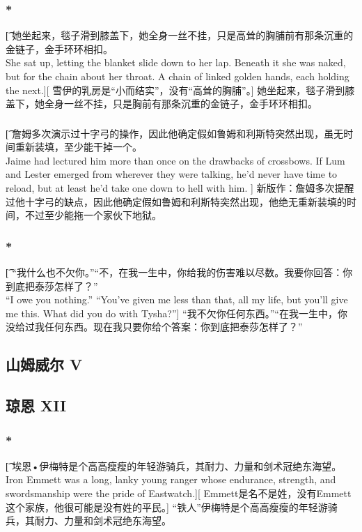 \documentclass[12pt,a4paper]{article}
\begin{document}
\subsubsection{\color{red}*}\t[
	她坐起来，毯子滑到膝盖下，她全身一丝不挂，只是高耸的胸脯前有那条沉重的金链子，金手环环相扣。\\
	She sat up, letting the blanket slide down to her lap. Beneath it she was naked, but for the chain about her throat. A chain of linked golden hands, each holding the next.][ 
	雪伊的乳房是“小而结实”，没有“高耸的胸脯”。]
	她坐起来，毯子滑到膝盖下，她全身一丝不挂，只是胸前有那条沉重的金链子，金手环环相扣。
	
\subsubsection{}\t[
	 詹姆多次演示过十字弓的操作，因此他确定假如鲁姆和利斯特突然出现，虽无时间重新装填，至少能干掉一个。\\
	 Jaime had lectured him more than once on the drawbacks of crossbows. If Lum and Lester emerged from wherever they were talking, he'd never have time to reload, but at least he'd take one down to hell with him. ]
	 新版作：詹姆多次提醒过他十字弓的缺点，因此他确定假如鲁姆和利斯特突然出现，他绝无重新装填的时间，不过至少能拖一个家伙下地狱。
	 
\subsubsection{\color{red}*}\t[
	“我什么也不欠你。”“不，在我一生中，你给我的伤害难以尽数。我要你回答：你到底把泰莎怎样了？”\\
	“I owe you nothing.” “You've given me less than that, all my life, but you'll give me this. What did you do with Tysha?”]
	“我不欠你任何东西。”“在我一生中，你没给过我任何东西。现在我只要你给个答案：你到底把泰莎怎样了？”
	
	
\subsection{山姆威尔 V}

\subsection{琼恩 XII}
\subsubsection{\color{red}*}\t[
	埃恩•伊梅特是个高高瘦瘦的年轻游骑兵，其耐力、力量和剑术冠绝东海望。\\
	Iron Emmett was a long, lanky young ranger whose endurance, strength, and swordsmanship were the pride of Eastwatch.][
	Emmett是名不是姓，没有Emmett这个家族，他很可能是没有姓的平民。]
	“铁人”伊梅特是个高高瘦瘦的年轻游骑兵，其耐力、力量和剑术冠绝东海望。
	
\end{document}
